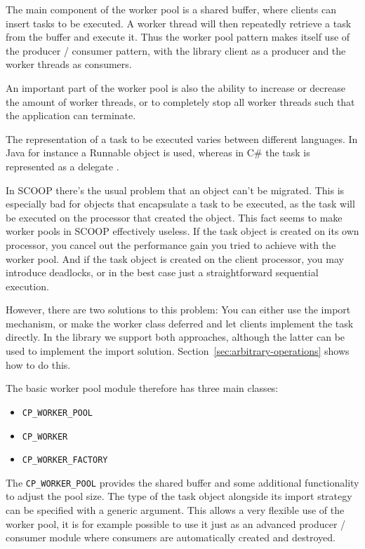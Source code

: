 \documentclass[a4paper,10pt]{report}
\begin{document}
The main component of the worker pool is a shared buffer, where clients can insert tasks to be executed.
A worker thread will then repeatedly retrieve a task from the buffer and execute it.
Thus the worker pool pattern makes itself use of the producer / consumer pattern, with the library client as a producer and the worker threads as consumers.

An important part of the worker pool is also the ability to increase or decrease the amount of worker threads, or to completely stop all worker threads such that the application can terminate.

The representation of a task to be executed varies between different languages.
In Java for instance a Runnable  object is used, whereas in C\# the task is represented as a delegate .

In SCOOP there's the usual problem that an object can't be migrated.
This is especially bad for objects that encapsulate a task to be executed, as the task will be executed on the processor that created the object.
This fact seems to make worker pools in SCOOP effectively useless.
If the task object is created on its own processor, you cancel out the performance gain you tried to achieve with the worker pool.
And if the task object is created on the client processor, you may introduce deadlocks, or in the best case just a straightforward sequential execution.

However, there are two solutions to this problem: You can either use the import mechanism, or make the worker class deferred and let clients implement the task directly.
In the library we support both approaches, although the latter can be used to implement the import solution.
Section~\ref{sec:arbitrary-operations} shows how to do this.

The basic worker pool module therefore has three main classes:
\begin{itemize}
 \item \lstinline!CP_WORKER_POOL!
 \item \lstinline!CP_WORKER!
 \item \lstinline!CP_WORKER_FACTORY!
\end{itemize}

The \lstinline!CP_WORKER_POOL! provides the shared buffer and some additional functionality to adjust the pool size.
The type of the task object alongside its import strategy can be specified with a generic argument.
This allows a very flexible use of the worker pool, it is for example possible to use it just as an advanced producer / consumer module where consumers are automatically created and destroyed.
\end{document}
